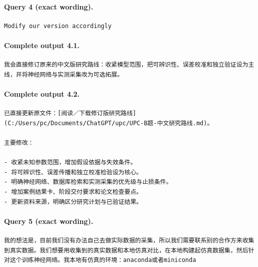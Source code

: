 \documentclass[UTF8,10pt]{ctexart}
\begin{document}
\paragraph{Query 4 (exact wording).}
\begin{Verbatim}[breaklines=true,breakanywhere=true,fontsize=\scriptsize,frame=single,framesep=2pt]
Modify our version accordingly
\end{Verbatim}

\paragraph{Complete output 4.1.}
\begin{Verbatim}[breaklines=true,breakanywhere=true,fontsize=\scriptsize,frame=single,framesep=2pt]
我会直接修订原来的中文版研究路线：收紧模型范围，把可辨识性、误差校准和独立验证设为主线，并将神经网络与实测采集改为可选拓展。
\end{Verbatim}

\paragraph{Complete output 4.2.}
\begin{Verbatim}[breaklines=true,breakanywhere=true,fontsize=\scriptsize,frame=single,framesep=2pt]
已直接更新原文件：[阅读／下载修订版研究路线](C:/Users/pc/Documents/ChatGPT/upc/UPC-B题-中文研究路线.md)。

主要修改：

- 收紧未知参数范围，增加假设依据与失效条件。
- 将可辨识性、误差传播和独立校准检验设为核心。
- 明确神经网络、数据库检索和实测采集的优先级与止损条件。
- 增加案例结果卡、阶段交付要求和论文检查要点。
- 更新资料来源，明确区分研究计划与已验证结果。
\end{Verbatim}

\paragraph{Query 5 (exact wording).}
\begin{Verbatim}[breaklines=true,breakanywhere=true,fontsize=\scriptsize,frame=single,framesep=2pt]
我的想法是，目前我们没有办法自己去做实际数据的采集，所以我们需要联系别的合作方来收集到真实数据。我们想要用收集到的真实数据和本地仿真对比，在本地构建起仿真数据集，然后针对这个训练神经网络。我本地有仿真的环境：anaconda或者miniconda
\end{Verbatim}
\end{document}
